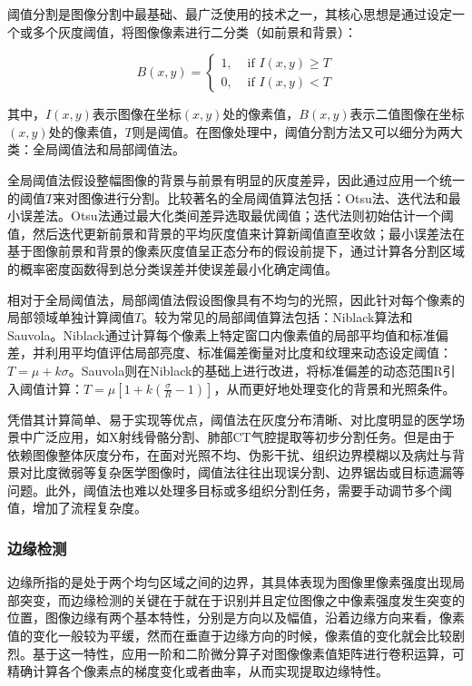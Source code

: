 阈值分割是图像分割中最基础、最广泛使用的技术之一，其核心思想是通过设定一个或多个灰度阈值，将图像像素进行二分类（如前景和背景）：

\begin{equation}
B(x, y)=\left\{\begin{array}{ll}1, & \text { if } I(x, y) \geq T \\ 0, & \text { if } I(x, y)<T\end{array}\right.
\end{equation}

其中，$I(x, y)$表示图像在坐标$(x, y)$处的像素值，$B(x, y)$表示二值图像在坐标$(x, y)$处的像素值，$T$则是阈值。在图像处理中，阈值分割方法又可以细分为两大类：全局阈值法和局部阈值法。

全局阈值法假设整幅图像的背景与前景有明显的灰度差异，因此通过应用一个统一的阈值$T$来对图像进行分割。比较著名的全局阈值算法包括：Otsu法、迭代法和最小误差法。Otsu法通过最大化类间差异选取最优阈值；迭代法则初始估计一个阈值，然后迭代更新前景和背景的平均灰度值来计算新阈值直至收敛；最小误差法在基于图像前景和背景的像素灰度值呈正态分布的假设前提下，通过计算各分割区域的概率密度函数得到总分类误差并使误差最小化确定阈值。

相对于全局阈值法，局部阈值法假设图像具有不均匀的光照，因此针对每个像素的局部领域单独计算阈值$T$。较为常见的局部阈值算法包括：Niblack算法和Sauvola。Niblack通过计算每个像素上特定窗口内像素值的局部平均值和标准偏差，并利用平均值评估局部亮度、标准偏差衡量对比度和纹理来动态设定阈值：$ T=\mu+k \sigma $。Sauvola则在Niblack的基础上进行改进，将标准偏差的动态范围R引入阈值计算：$ T=\mu\left[1+k\left(\frac{\sigma}{R}-1\right)\right] $，从而更好地处理变化的背景和光照条件。

凭借其计算简单、易于实现等优点，阈值法在灰度分布清晰、对比度明显的医学场景中广泛应用，如X射线骨骼分割、肺部CT气腔提取等初步分割任务。但是由于依赖图像整体灰度分布，在面对光照不均、伪影干扰、组织边界模糊以及病灶与背景对比度微弱等复杂医学图像时，阈值法往往出现误分割、边界锯齿或目标遗漏等问题。此外，阈值法也难以处理多目标或多组织分割任务，需要手动调节多个阈值，增加了流程复杂度。

\subsubsection{边缘检测}


边缘所指的是处于两个均匀区域之间的边界，其具体表现为图像里像素强度出现局部突变，而边缘检测的关键在于就在于识别并且定位图像之中像素强度发生突变的位置，图像边缘有两个基本特性，分别是方向以及幅值，沿着边缘方向来看，像素值的变化一般较为平缓，然而在垂直于边缘方向的时候，像素值的变化就会比较剧烈。基于这一特性，应用一阶和二阶微分算子对图像像素值矩阵进行卷积运算，可精确计算各个像素点的梯度变化或者曲率，从而实现提取边缘特性\cite{ziou1998edge}。

